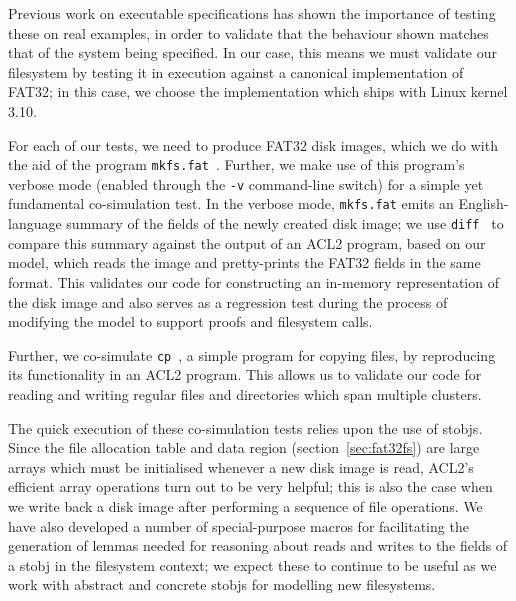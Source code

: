 \documentclass[submission,copyright,creativecommons]{eptcs}
\begin{document}
Previous work on executable specifications \cite{goel2014simulation}
has shown the importance of testing these on real examples, in order
to validate that the behaviour shown matches that of the system being
specified. In our case, this means we must validate our filesystem by
testing it in execution against a canonical implementation of FAT32;
in this case, we choose the implementation which ships with Linux
kernel 3.10.

For each of our tests, we need to produce FAT32 disk images, which we
do with the aid of the program
\texttt{mkfs.fat}~\cite{hudsonmkfs}. Further, we make use of this
program's verbose mode (enabled through the \texttt{-v} command-line
switch) for a simple yet fundamental co-simulation test. In the verbose
mode, \texttt{mkfs.fat} emits an English-language summary of the
fields of the
newly created disk image; we use \texttt{diff}~\cite{eggertdiff} to
compare this summary against the output of an ACL2 program, based on
our model, which reads the image and pretty-prints the FAT32 fields in the
same format. This validates our code for constructing an in-memory
representation of the disk image and also serves as a regression test
during the process of modifying the model to support proofs and
filesystem calls.

Further, we co-simulate \texttt{cp}~\cite{granlundcp}, a simple
program for copying files, by
reproducing its functionality in an ACL2 program. This allows us to
validate our code for reading and writing regular files and
directories which span multiple clusters.

The quick execution of these co-simulation tests relies upon the use
of stobjs. Since the file allocation table and data region
(section~\ref{sec:fat32fs}) are large arrays which must be initialised
whenever a new disk image is read, ACL2's efficient array operations
turn out to be very helpful; this is also the case when we write back
a disk image after performing a sequence of file operations. We have
also developed a number of special-purpose macros for facilitating the
generation of lemmas needed for reasoning about reads and writes to
the fields of a stobj in the filesystem context; we expect these to
continue to be useful as we work with abstract and concrete stobjs for
modelling new filesystems.


\end{document}
